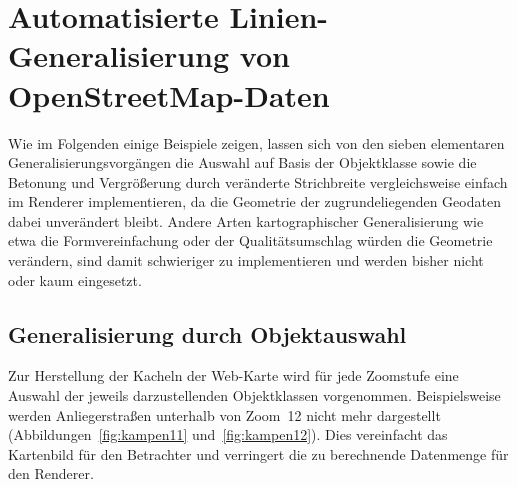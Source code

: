 \documentclass[../main/thesis.tex]{subfiles}
\begin{document}
\section{Automatisierte Linien-Generalisierung von OpenStreetMap-Daten}
\label{ch:existing-generalisation}

Wie im Folgenden einige Beispiele zeigen, lassen sich von den sieben elementaren Generalisierungsvorgängen  die Auswahl auf Basis der Objektklasse sowie die Betonung und Vergrößerung durch veränderte Strichbreite vergleichsweise einfach im Renderer implementieren, da die Geometrie der zugrundeliegenden Geodaten dabei unverändert bleibt.
Andere Arten kartographischer Generalisierung wie etwa die Formvereinfachung oder der Qualitätsumschlag würden die Geometrie verändern, sind damit schwieriger zu implementieren und werden bisher nicht oder kaum eingesetzt.



\subsection{Generalisierung durch Objektauswahl}

Zur Herstellung der Kacheln der Web-Karte wird für jede Zoomstufe eine Auswahl der jeweils darzustellenden Objektklassen vorgenommen.
Beispielsweise werden Anliegerstraßen  unterhalb von Zoom~12 nicht mehr dargestellt (Abbildungen~\ref{fig:kampen11} und~\ref{fig:kampen12}).
Dies vereinfacht das Kartenbild für den Betrachter und verringert die zu berechnende Datenmenge für den Renderer.

\end{document}

